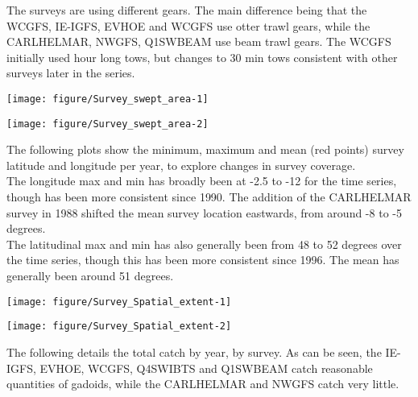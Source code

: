 \documentclass[12pt]{article}\usepackage[]{graphicx}\usepackage[]{color}
\makeatletter
\def\maxwidth{ %
  \ifdim\Gin@nat@width>\linewidth
    \linewidth
  \else
    \Gin@nat@width
  \fi
}
\newenvironment{knitrout}{}{} %
\makeatother
\begin{document}
The surveys are using different gears. The main difference being that the
WCGFS, IE-IGFS, EVHOE and WCGFS use otter trawl gears, while the CARLHELMAR,
NWGFS, Q1SWBEAM use beam trawl gears. The WCGFS initially used hour long tows,
but changes to 30 min tows consistent with other surveys later in the series. \\ 

\begin{knitrout}\footnotesize
{}\color{fgcolor}

{\centering \texttt{[image: figure/Survey\_swept\_area-1]} 

}




{\centering \texttt{[image: figure/Survey\_swept\_area-2]} 

}



\end{knitrout}

The following plots show the minimum, maximum and mean (red points) survey
latitude and longitude per year, to explore changes in survey coverage. \\

The longitude max and min has broadly been at -2.5 to -12 for the time series,
though has been more consistent since 1990. The addition of the CARLHELMAR
survey in 1988 shifted the mean survey location eastwards, from around -8 to -5
degrees. \\

The latitudinal max and min has also generally been from 48 to 52 degrees over
the time series, though this has been more consistent since 1996. The mean has
generally been around 51 degrees.


\begin{knitrout}\footnotesize
{}\color{fgcolor}

{\centering \texttt{[image: figure/Survey\_Spatial\_extent-1]} 

}




{\centering \texttt{[image: figure/Survey\_Spatial\_extent-2]} 

}



\end{knitrout}


The following details the total catch by year, by survey. As can be seen, the
IE-IGFS, EVHOE, WCGFS, Q4SWIBTS and Q1SWBEAM catch reasonable quantities of
gadoids, while the CARLHELMAR and NWGFS catch very little. \\
\end{document}

